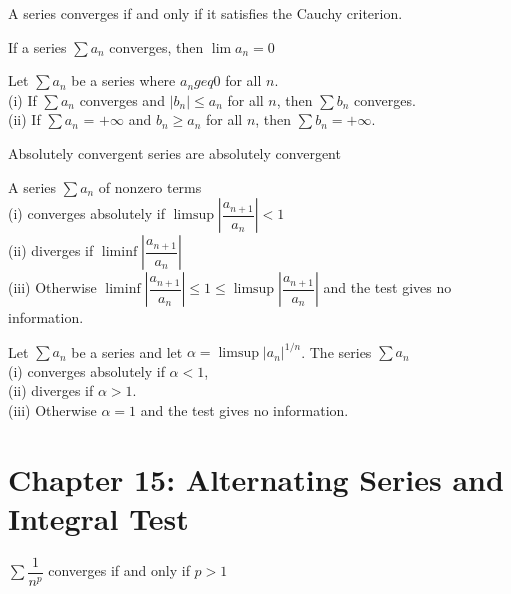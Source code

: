 \documentclass[twoside, 10pt]{article}
\begin{document}
\begin{thm}
A series converges if and only if it satisfies the Cauchy criterion.
\end{thm}

\begin{cor}
If a series $\sum a_n$ converges, then $\lim a_n = 0$
\end{cor}

\begin{defn}
Let $\sum a_n$ be a series where $a_n geq 0$ for all $n$.\\
(i) If $\sum a_n$ converges and $|b_n| \leq a_n$ for all $n$, then $\sum b_n$ converges.\\
(ii) If $\sum a_n$ = $+ \infty$ and $b_n \geq a_n$ for all $n$, then $\sum b_n = +\infty$.
\end{defn}

\begin{cor}
Absolutely convergent series are absolutely convergent
\end{cor}

\begin{defn}
A series $\sum a_n$ of nonzero terms\\
(i) converges absolutely if $\limsup\left|\dfrac{a_{n+1}}{a_n}\right| < 1$\\
(ii) diverges if $\liminf\left|\dfrac{a_{n+1}}{a_n}\right|$\\
(iii) Otherwise $\liminf\left|\dfrac{a_{n+1}}{a_n}\right| \leq 1 \leq \limsup\left|\dfrac{a_{n+1}}{a_n}\right|$ and the test gives no information.
\end{defn}

\begin{defn}
Let $\sum a_n$ be a series and let $\alpha = \limsup |a_n|^{1/n}$. The series $\sum a_n$\\
(i) converges absolutely if $\alpha < 1$,\\
(ii) diverges if $\alpha >1$.\\
(iii) Otherwise $\alpha = 1$ and the test gives no information.
\end{defn}

\section*{Chapter 15: Alternating Series and Integral Test}
\begin{thm}
$\sum \dfrac{1}{n^p}$ converges if and only if $p > 1$
\end{thm}
\end{document}
